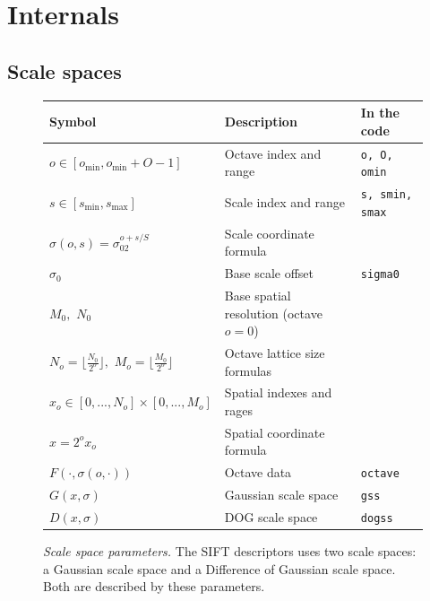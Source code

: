 \documentclass{article}
\let\oldtt=\tt
\renewcommand{\tt}{\oldtt\color{codecolor}}
\begin{document}
\appendix
\section{Internals}\label{sift.internals}

\subsection{Scale spaces}\label{sift.internals.ss}
\begin{figure}
\begin{center}
\begin{tabular}{lp{}p{}}
\hline
\bf Symbol & \bf Description & \bf In the code
\\\hline
$o\in[o_{\min},o_{\min}+O-1]$ & Octave index and range & \tt o, O, omin
\\
$s\in[s_{\min},s_{\max}]$   & Scale index and range &  \tt s, smin, smax
\\
$\sigma(o,s) = \sigma_02^{o + s/S}$ & Scale coordinate formula &
\\
$\sigma_0$ & Base scale offset & \tt sigma0
\\
$M_0,$ $N_0$ & Base spatial resolution (octave $o=0$) &
\\
$N_o = \lfloor \frac{N_0}{2^o}\rfloor,$
$M_o = \lfloor \frac{M_0}{2^o}\rfloor$
& Octave lattice size formulas &
\\
$x_o \in [0,...,N_o]\times[0,...,M_o]$ & Spatial indexes and rages &
\\
$x = 2^o x_o$ & Spatial coordinate formula
\\
$F(\cdot,\sigma(o,\cdot))$ & Octave data & \tt octave
\\
$G(x,\sigma)$ & Gaussian scale space & \tt gss
\\
$D(x,\sigma)$ & DOG scale space & \tt dogss
\\\hline
\end{tabular}
\end{center}
\caption{{\sl Scale space parameters.} The SIFT descriptors uses two scale spaces: a Gaussian scale space and a Difference of Gaussian scale space. Both are described by these parameters.}\label{tab:ssparam}
\end{figure}
\end{document}
